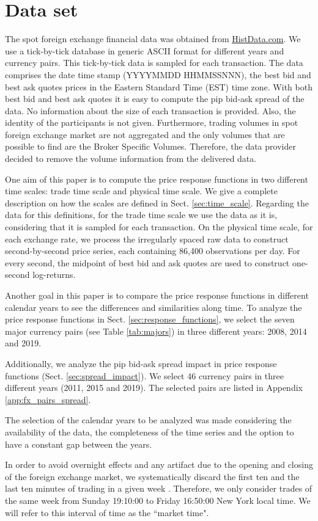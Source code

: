 \section{Data set}\label{sec:data_set}

The spot foreign exchange financial data was obtained from
\href{www.histdata.com}{HistData.com}. We use a tick-by-tick database in
generic ASCII format for different years and currency pairs. This tick-by-tick
data is sampled for each transaction. The data comprises the date time stamp
(YYYYMMDD HHMMSSNNN), the best bid and best ask quotes prices in the Eastern
Standard Time (EST) time zone. With both best bid and best ask quotes it is
easy to compute the pip bid-ask spread of the data. No information about the
size of each transaction is provided. Also, the identity of the participants is
not given. Furthermore, trading volumes in spot foreign exchange market are not
aggregated and the only volumes that are possible to find are the Broker
Specific Volumes. Therefore, the data provider decided to remove the volume
information from the delivered data.

One aim of this paper is to compute the price response functions in two
different time scales: trade time scale and physical time scale. We give a
complete description on how the scales are defined in Sect.
\ref{sec:time_scale}. Regarding the data for this definitions, for the trade
time scale we use the data as it is, considering that it is sampled for each
transaction. On the physical time scale, for each exchange rate, we process the
irregularly spaced raw data to construct second-by-second price series, each
containing 86,400 observations per day. For every second, the midpoint of best
bid and ask quotes are used to construct one-second log-returns.

Another goal in this paper is to compare the price response functions in
different calendar years to see the differences and similarities along time.
To analyze the price response functions in Sect. \ref{sec:response_functions},
we select the seven major currency pairs (see Table \ref{tab:majors}) in three
different years: 2008, 2014 and 2019.

Additionally, we analyze the pip bid-ask spread impact in price response
functions (Sect. \ref{sec:spread_impact}). We select 46 currency pairs in three
different years (2011, 2015 and 2019). The selected pairs are listed in
Appendix \ref{app:fx_pairs_spread}.

The selection of the calendar years to be analyzed was made considering the
availability of the data, the completeness of the time series and the option to
have a constant gap between the years.

In order to avoid overnight effects and any artifact due to the opening and
closing of the foreign exchange market, we systematically discard the first
ten and the last ten minutes of trading in a given week
\cite{Bouchaud_2004,my_paper_response_financial,Wang_2016_cross,large_prices_changes,spread_changes_affect}.
Therefore, we only consider trades of the same week from Sunday 19:10:00 to
Friday 16:50:00 New York local time. We will refer to this interval of time as
the ``market time".
